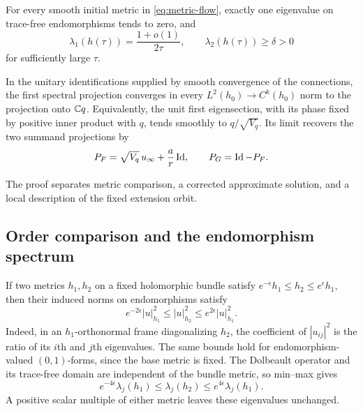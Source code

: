 \begin{theorem}\label{thm:flow-two-factor}
For every smooth initial metric in \eqref{eq:metric-flow}, exactly one
eigenvalue on trace-free endomorphisms tends to zero, and
\begin{equation}\label{eq:flow-rate}
 \lambda_1(h(\tau))=\frac{1+o(1)}{2\tau},\qquad
 \lambda_2(h(\tau))\ge\delta>0
\end{equation}
for sufficiently large $\tau$.

In the unitary identifications supplied by smooth convergence of the
connections, the first spectral projection converges in every
$L^2(h_0)\to C^k(h_0)$ norm to the projection onto $\mathbb C q$.
Equivalently, the unit first eigensection, with its phase fixed by
positive inner product with $q$, tends smoothly to $q/\sqrt{V_q}$.
Its limit recovers the two summand projections by
\[
 P_F=\sqrt{V_q}\,u_\infty+\frac ar\operatorname{Id},\qquad P_G=\operatorname{Id}-P_F.
\]
\end{theorem}

The proof separates metric comparison, a corrected approximate
solution, and a local description of the fixed extension orbit.

\subsection{Order comparison and the endomorphism spectrum}

If two metrics $h_1,h_2$ on a fixed holomorphic bundle satisfy
$e^{-\epsilon}h_1\le h_2\le e^\epsilon h_1$, then their induced
norms on endomorphisms satisfy
\[
 e^{-2\epsilon}|u|_{h_1}^2
 \le |u|_{h_2}^2\le e^{2\epsilon}|u|_{h_1}^2.
\]
Indeed, in an $h_1$-orthonormal frame diagonalizing $h_2$, the
coefficient of $|u_{ij}|^2$ is the ratio of its $i$th and $j$th
eigenvalues. The same bounds hold for endomorphism-valued $(0,1)$-forms,
since the base metric is fixed. The Dolbeault operator and its
trace-free domain are independent of the bundle metric, so min--max
gives
\begin{equation}\label{eq:metric-spectral-comparison}
 e^{-4\epsilon}\lambda_j(h_1)
 \le\lambda_j(h_2)\le e^{4\epsilon}\lambda_j(h_1).
\end{equation}
A positive scalar multiple of either metric leaves these eigenvalues
unchanged.

